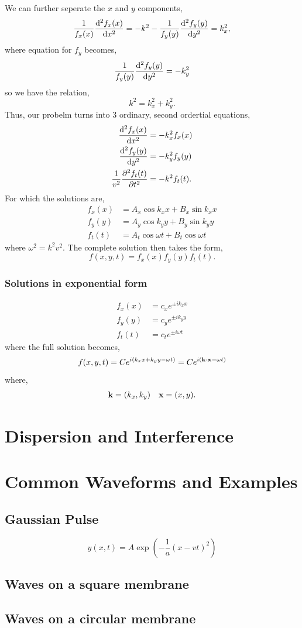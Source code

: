 \documentclass{book}
\begin{document}
We can further seperate the $x$ and $y$ components,
\begin{equation}
	\frac{1}{f_x(x)}\dv[2]{f_x(x)}{x} = -k^2 - \frac{1}{f_y(y)}\dv[2]{f_y(y)}{y} = k_x^2,
\end{equation}
where equation for $f_y$ becomes,
\begin{equation}
	 \frac{1}{f_y(y)}\dv[2]{f_y(y)}{y} = -k_y^2
\end{equation}
so we have the relation,
\begin{equation}
	k^2 = k_x^2 + k_y^2.
\end{equation}
Thus, our probelm turns into 3 ordinary, second ordertial equations,
\begin{align}
	\dv[2]{f_x(x)}{x} & = -k_x^2f_x(x) \\	
	\dv[2]{f_y(y)}{y} & = -k_y^2f_y(y) \\
	\frac{1}{v^2} \pdv[2]{f_t(t)}{t} & = -k^2f_t(t).
\end{align}
For which the solutions are,
\begin{align}
	f_x(x) & = A_x\cos k_xx + B_x\sin k_x x \\
	f_y(y) & = A_y\cos k_yy + B_y\sin k_y y \\
	f_t(t) & = A_t\cos\omega t + B_t \cos\omega t
\end{align}
where $\omega^2 = k^2v^2$. The complete solution then takes the form,
\begin{equation}
	f(x,y,t) = f_x(x)f_y(y)f_t(t).
\end{equation}
\subsection{Solutions in exponential form}
\begin{align}
	f_x(x) &= c_xe^{\pm ik_x x} \\
	f_y(y) &= c_ye^{\pm ik_y y} \\
	f_t(t) &= c_te^{\pm i\omega t}
\end{align}
where the full solution becomes,
\begin{equation}
	f(x,y,t) = Ce^{i(k_xx + k_yy - \omega t)} = Ce^{i(\vb{k}\cdot\vb{x}-\omega t)}
\end{equation}
where,
\begin{align}
	\vb{k} = (k_x, k_y) && \vb{x} = (x,y).
\end{align}

\chapter{Dispersion and Interference}

\appendix
\chapter{Common Waveforms and Examples}
\section{Gaussian Pulse}
\begin{equation}
    y(x,t) = A\exp\left(-\frac{1}{a}(x-vt)^2\right)
\end{equation}

\section{Waves on a square membrane}
\section{Waves on a circular membrane}
\end{document}

